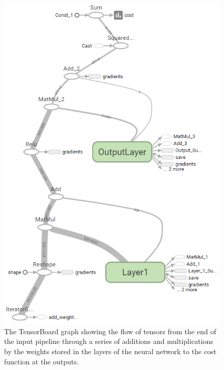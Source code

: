 \documentclass[a4paper,11pt,notitlepage]{article}
\begin{document}
\begin{figure}[H]
	\centering
	\vspace{0.5cm}
	\includegraphics[scale = 0.70]{figs/network_diagram.png}
	\caption{The TensorBoard graph showing the flow of tensors from the end of the input pipeline through a series of additions and multiplications by the weights stored in the layers of the neural network to the cost function at the outputs.}
	\label{network_diagram1}
\end{figure}
\end{document}
